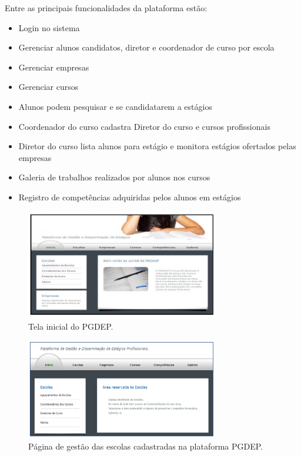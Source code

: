 \documentclass[cic,tc]{iiufrgs}
\begin{document}
Entre as principais funcionalidades da plataforma estão:
\begin{itemize}
    \item Login no sistema
    \item Gerenciar alunos candidatos, diretor e coordenador de curso por escola
    \item Gerenciar empresas 
    \item Gerenciar cursos
    \item Alunos podem pesquisar e se candidatarem a estágios
    \item Coordenador do curso cadastra Diretor do curso e cursos profissionais
    \item Diretor do curso lista alunos para estágio e monitora estágios ofertados pelas empresas
    \item Galeria de trabalhos realizados por alunos nos cursos
    \item Registro de competências adquiridas pelos alunos em estágios
\end{itemize}

\begin{figure}[h]
    \caption{Tela inicial do PGDEP.}
        \begin{center}
            \includegraphics[width=0.75\textwidth]{figuras/rel03.png}
        \end{center}
    \label{telaHomePGDEP}
\end{figure}

\begin{figure}[h]
    \caption{Página de gestão das escolas cadastradas na plataforma PGDEP.}
        \begin{center}
            \includegraphics[width=0.75\textwidth]{figuras/rel04.png}
        \end{center}
    \label{telaEscolaPGDEP}
\end{figure}
\end{document}

